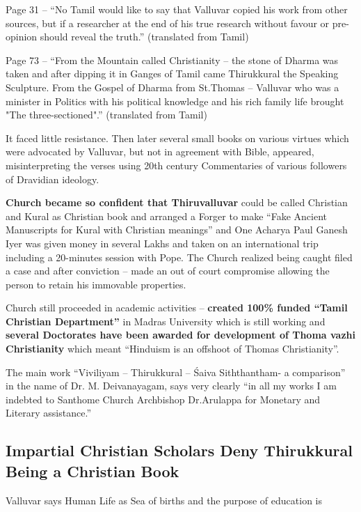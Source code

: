 Page 31\endnote{} -- “No Tamil would like to say that Valluvar copied his work from other sources, but if a researcher at the end of his true research without favour or pre-opinion should reveal the truth.” (translated from Tamil) 

Page 73\endnote{} -- “From the Mountain called Christianity – the stone of Dharma was taken and after dipping it in Ganges of Tamil came Thirukkural the Speaking Sculpture. From the Gospel of Dharma from St.Thomas – Valluvar who was a minister in Politics with his political knowledge and his rich family life brought "The three-sectioned".” (translated from Tamil)

It faced little resistance. Then later several small books on various virtues which were advocated by Valluvar, but not in agreement with Bible, appeared, misinterpreting the verses using 20th century Commentaries of various followers of Dravidian ideology.

\textbf{Church became so confident that Thiruvalluvar} could be called Christian and Kural as Christian book and arranged a Forger to make “Fake Ancient Manuscripts for Kural with Christian meanings” and One Acharya Paul Ganesh Iyer\endnote{} was given money in several Lakhs and taken on an international trip including a 20-minutes session with Pope. The Church realized being caught filed a case and after conviction\endnote{} – made an out of court compromise allowing the person to retain his immovable properties.

Church still proceeded in academic activities – \textbf{created 100\% funded “Tamil Christian Department”} in Madras University\endnote{} which is still working and \textbf{several Doctorates\supskpt{\endnote{}} have been awarded for development of Thoma vazhi Christianity} which meant “Hinduism is an offshoot of Thomas Christianity”.

The main work “Viviliyam – Thirukkural – Śaiva Siththantham- a comparison”\endnote{} in the name of Dr. M. Deivanayagam, says very clearly “in all my works I am indebted to Santhome Church Archbishop Dr.Arulappa for Monetary and Literary assistance.”

\subsection*{Impartial Christian Scholars Deny Thirukkural Being a Christian Book}

Valluvar says Human Life as Sea of births and the purpose of education is

